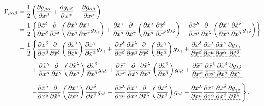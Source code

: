 \documentclass[a4paper,pdftex,10pt]{article}
\begin{document}
\begin{align}
  \Gamma_{\mu\alpha\beta}
   & =
  \frac{1}{2}
  \left(
  \pdv{g_{\mu\alpha}}{x^{\beta}}
  +
  \pdv{g_{\mu\beta}}{x^{\alpha}}
  -
  \pdv{g_{\alpha\beta}}{x^{\mu}}
  \right)
  \nonumber
  \\
   & =
  \frac{1}{2}
  \left\{
  \pdv{\tilde{x}^{\delta}}{x^{\beta}}\pdv{}{\tilde{x}^{\delta}}
  \left(
  \pdv{\tilde{x}^{\lambda}}{x^{\mu}}\pdv{\tilde{x}^{\gamma}}{x^{\alpha}}g_{\lambda\gamma}
  \right)
  +
  \pdv{\tilde{x}^{\gamma}}{x^{\alpha}}\pdv{}{\tilde{x}^{\gamma}}
  \left(
  \pdv{\tilde{x}^{\lambda}}{x^{\mu}}\pdv{\tilde{x}^{\delta}}{x^{\beta}}g_{\lambda\delta}
  \right)
  -
  \pdv{\tilde{x}^{\lambda}}{x^{\mu}}\pdv{}{\tilde{x}^{\lambda}}
  \left(
  \pdv{\tilde{x}^{\gamma}}{x^{\alpha}}\pdv{\tilde{x}^{\delta}}{x^{\beta}}g_{\gamma\delta}
  \right)
  \nonumber
  \right\}
  \nonumber
  \\
   & =
  \frac{1}{2}
  \left\{
  \pdv{\tilde{x}^{\delta}}{x^{\beta}}\pdv{}{\tilde{x}^{\delta}}
  \left( \pdv{\tilde{x}^{\lambda}}{x^{\mu}} \right)
  \pdv{\tilde{x}^{\gamma}}{x^{\alpha}}g_{\lambda\gamma}
  +
  \pdv{\tilde{x}^{\delta}}{x^{\beta}}
  \pdv{\tilde{x}^{\lambda}}{x^{\mu}}
  \pdv{}{\tilde{x}^{\delta}}
  \left(  \pdv{\tilde{x}^{\gamma}}{x^{\alpha}} \right)
  g_{\lambda\gamma}
  +
  \uwave{
    \pdv{\tilde{x}^{\delta}}{x^{\beta}}
    \pdv{\tilde{x}^{\lambda}}{x^{\mu}}\pdv{\tilde{x}^{\gamma}}{x^{\alpha}}
    \pdv{g_{\lambda\gamma}}{\tilde{x}^{\delta}}
  }
  \right.
  \nonumber
  \\
   & \qquad
  +
  \pdv{\tilde{x}^{\gamma}}{x^{\alpha}}\pdv{}{\tilde{x}^{\gamma}}
  \left(
  \pdv{\tilde{x}^{\lambda}}{x^{\mu}}
  \right)
  \pdv{\tilde{x}^{\delta}}{x^{\beta}}g_{\lambda\delta}
  +
  \pdv{\tilde{x}^{\gamma}}{x^{\alpha}}\pdv{}{\tilde{x}^{\gamma}}
  \pdv{\tilde{x}^{\lambda}}{x^{\mu}}
  \left(  \pdv{\tilde{x}^{\delta}}{x^{\beta}}
  \right)
  g_{\lambda\delta}
  +
  \uwave{
    \pdv{\tilde{x}^{\gamma}}{x^{\alpha}}
    \pdv{\tilde{x}^{\lambda}}{x^{\mu}}\pdv{\tilde{x}^{\delta}}{x^{\beta}}
    \pdv{g_{\lambda\delta}}{\tilde{x}^{\gamma}}
  }
  \nonumber
  \\
   & \qquad
  \left.
  -
  \pdv{\tilde{x}^{\lambda}}{x^{\mu}}\pdv{}{\tilde{x}^{\lambda}}
  \left(
  \pdv{\tilde{x}^{\gamma}}{x^{\alpha}}
  \right)
  \pdv{\tilde{x}^{\delta}}{x^{\beta}}g_{\gamma\delta}
  -
  \pdv{\tilde{x}^{\lambda}}{x^{\mu}}\pdv{\tilde{x}^{\gamma}}{x^{\alpha}}
  \pdv{}{\tilde{x}^{\lambda}}
  \left(
  \pdv{\tilde{x}^{\delta}}{x^{\beta}}
  \right)
  g_{\gamma\delta}
  -
  \uwave{
    \pdv{\tilde{x}^{\lambda}}{x^{\mu}}
    \pdv{\tilde{x}^{\gamma}}{x^{\alpha}}\pdv{\tilde{x}^{\delta}}{x^{\beta}}
    \pdv{g_{\gamma\delta}}{\tilde{x}^{\lambda}}
  }
  \right\}
  .
  \label{eqn:1}
\end{align}
\end{document}
